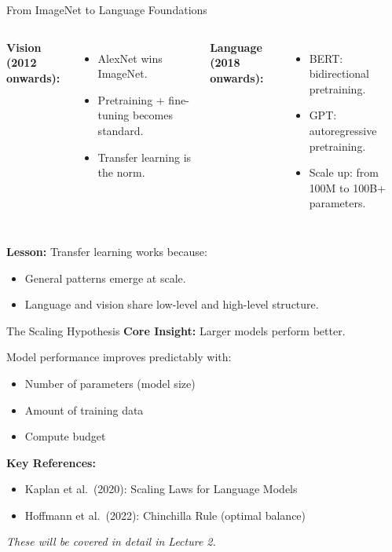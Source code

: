 \documentclass[aspectratio=169,10pt]{beamer}
\begin{document}
\begin{frame}{From ImageNet to Language Foundations}
  \begin{columns}[T]
      \textbf{Vision (2012 onwards):}
      \begin{itemize}
        \item AlexNet wins ImageNet.
        \item Pretraining + fine-tuning becomes standard.
        \item Transfer learning is the norm.
      \end{itemize}

      \textbf{Language (2018 onwards):}
      \begin{itemize}
        \item BERT: bidirectional pretraining.
        \item GPT: autoregressive pretraining.
        \item Scale up: from 100M to 100B+ parameters.
      \end{itemize}
  \end{columns}

  \vspace{0.4cm}

  \textbf{Lesson:} Transfer learning works because:
  \begin{itemize}
    \item General patterns emerge at scale.
    \item Language and vision share low-level and high-level structure.
  \end{itemize}
\end{frame}

\begin{frame}{The Scaling Hypothesis}
  \textbf{Core Insight:} Larger models perform better.

  \vspace{0.4cm}

  \begin{tcolorbox}[hitbox, title=Scaling Laws]
    Model performance improves predictably with:
    \begin{itemize}
      \item Number of parameters (model size)
      \item Amount of training data
      \item Compute budget
    \end{itemize}
  \end{tcolorbox}

  \vspace{0.3cm}

  \textbf{Key References:}
  \begin{itemize}
    \item Kaplan et al.\ (2020): Scaling Laws for Language Models
    \item Hoffmann et al.\ (2022): Chinchilla Rule (optimal balance)
  \end{itemize}

  \textit{These will be covered in detail in Lecture 2.}
\end{frame}
\end{document}
